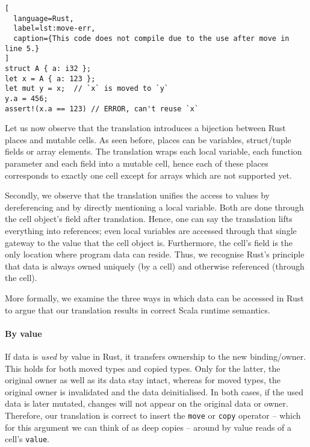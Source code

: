 \begin{lstlisting}[
  language=Rust,
  label=lst:move-err,
  caption={This code does not compile due to the use after move in line 5.}
]
struct A { a: i32 };
let x = A { a: 123 };
let mut y = x;  // `x` is moved to `y`
y.a = 456;
assert!(x.a == 123) // ERROR, can't reuse `x`
\end{lstlisting}

Let us now observe that the translation introduces a bijection between
Rust places and mutable cells. As seen before, places can be variables,
struct/tuple fields or array elements. The translation wraps each local
variable, each function parameter and each field into a mutable cell,
hence each of these places corresponds to exactly one cell except for
arrays which are not supported yet.

Secondly, we observe that the translation unifies the access to values
by dereferencing and by directly mentioning a local variable. Both are
done through the cell object's field after translation. Hence, one can
say the translation lifts everything into references; even local
variables are accessed through that single gateway to the value that the
cell object is. Furthermore, the cell's field is the only location where
program data can reside. Thus, we recognise Rust's principle that data
is always owned uniquely (by a cell) and otherwise referenced (through
the cell).

More formally, we examine the three ways in which data can be accessed
in Rust to argue that our translation results in correct Scala runtime
semantics.

\paragraph{By value}
\label{sec:correctness-by-value}

If data is \emph{used} by value in Rust, it transfers ownership to the
new binding/owner. This holds for both moved types and copied types.
Only for the latter, the original owner as well as its data stay intact,
whereas for moved types, the original owner is invalidated and the data
deinitialised. In both cases, if the used data is later mutated, changes
will not appear on the original data or owner. Therefore, our
translation is correct to insert the \passthrough{\lstinline!move!} or
\passthrough{\lstinline!copy!} operator -- which for this argument we
can think of as deep copies -- around by value reads of a cell's
\passthrough{\lstinline!value!}.

